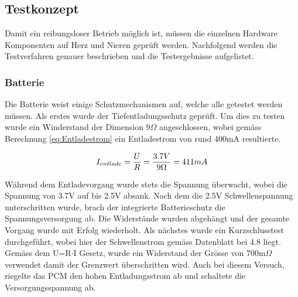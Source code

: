 \subsection{Testkonzept}
Damit ein reibungsloser Betrieb möglich ist, müssen die einzelnen Hardware Komponenten auf Herz und Nieren geprüft werden. Nachfolgend werden die Testverfahren genauer beschrieben und die Testergebnisse aufgelistet.

\subsubsection{Batterie}
Die Batterie weist einige Schutzmechanismen auf, welche alle getestet werden müssen. Als erstes wurde der Tiefentladungsschutz geprüft. Um dies zu testen wurde ein Winderstand der Dimension 9$\Omega$ angeschlossen, wobei gemäss Berechnung \ref{eq:Entladestrom} ein Entladestrom von rund 400mA resultierte.

\begin{equation}
\centering
I_{entlade}=\frac{U}{R}=\frac{3.7V}{9\Omega }= 411mA
\label{eq:Entladestrom}
\end{equation}

Während dem Entladevorgang wurde stets die Spannung überwacht, wobei die Spannung von 3.7V auf bis 2.5V absank. Nach dem die 2.5V Schwellenspannung unterschritten wurde, brach der integrierte Batterieschutz die Spannungsversorgung ab. Die Widerstände wurden abgehängt und der gesamte Vorgang wurde mit Erfolg wiederholt.
\newline
Als nächstes wurde ein Kurzschlusstest durchgeführt, wobei hier der Schwellenstrom gemäss Datenblatt bei 4.8 liegt. Gemäss dem U=R$\cdot$I Gesetz, wurde ein Widerstand der Grösse von 700m$\Omega$ verwendet damit der Grenzwert überschritten wird. Auch bei diesem Versuch, riegelte das PCM den hohen Entladungsstrom ab und schaltete die Versorgungsspannung ab.


